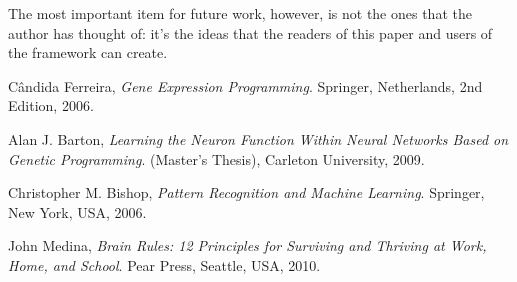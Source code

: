 \documentclass[a4paper,11pt]{report}
\begin{document}
The most important item for future work, however, is not the ones that the author has thought of: it's
the ideas that the readers of this paper and users of the framework can create. 



\begin{thebibliography}{9}

  C\^{a}ndida Ferreira,
  \emph{Gene Expression Programming}.
  Springer, Netherlands,
  2nd Edition,
  2006.

  Alan J. Barton, 
  \emph{Learning the Neuron Function Within Neural Networks Based on Genetic Programming}.
  (Master's Thesis),
  Carleton University, 2009.

  Christopher M. Bishop,
  \emph{Pattern Recognition and Machine Learning}.
  Springer, New York, USA,
  2006.

  John Medina, 
  \emph{Brain Rules: 12 Principles for Surviving and Thriving at Work, Home, and School}.
  Pear Press, Seattle, USA,
  2010.


\end{thebibliography}
\end{document}
